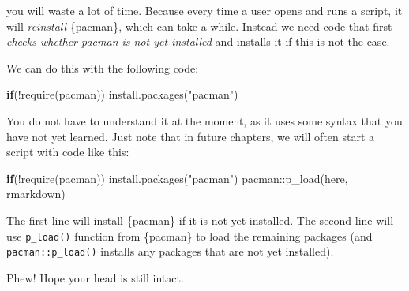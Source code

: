 \documentclass[
  letterpaper,
  DIV=11,
  numbers=noendperiod]{scrreprt}
\newenvironment{Shaded}{\begin{snugshade}}{\end{snugshade}}
\newcommand{\ControlFlowTok}[1]{\textcolor[rgb]{0.00,0.23,0.31}{\textbf{#1}}}
\newcommand{\FunctionTok}[1]{\textcolor[rgb]{0.28,0.35,0.67}{#1}}
\newcommand{\NormalTok}[1]{\textcolor[rgb]{0.00,0.23,0.31}{#1}}
\newcommand{\SpecialCharTok}[1]{\textcolor[rgb]{0.37,0.37,0.37}{#1}}
\newcommand{\StringTok}[1]{\textcolor[rgb]{0.13,0.47,0.30}{#1}}
\begin{document}
you will waste a lot of time. Because every time a user opens and runs a
script, it will \emph{reinstall} \{pacman\}, which can take a while.
Instead we need code that first \emph{checks whether pacman is not yet
installed} and installs it if this is not the case.

We can do this with the following code:

\begin{Shaded}
\begin{Highlighting}[]
\ControlFlowTok{if}\NormalTok{(}\SpecialCharTok{!}\FunctionTok{require}\NormalTok{(pacman)) }\FunctionTok{install.packages}\NormalTok{(}\StringTok{"pacman"}\NormalTok{)}
\end{Highlighting}
\end{Shaded}

You do not have to understand it at the moment, as it uses some syntax
that you have not yet learned. Just note that in future chapters, we
will often start a script with code like this:

\begin{Shaded}
\begin{Highlighting}[]
\ControlFlowTok{if}\NormalTok{(}\SpecialCharTok{!}\FunctionTok{require}\NormalTok{(pacman)) }\FunctionTok{install.packages}\NormalTok{(}\StringTok{"pacman"}\NormalTok{)}
\NormalTok{pacman}\SpecialCharTok{::}\FunctionTok{p\_load}\NormalTok{(here, rmarkdown)}
\end{Highlighting}
\end{Shaded}

The first line will install \{pacman\} if it is not yet installed. The
second line will use \texttt{p\_load()} function from \{pacman\} to load
the remaining packages (and \texttt{pacman::p\_load()} installs any
packages that are not yet installed).

Phew! Hope your head is still intact.
\end{document}
